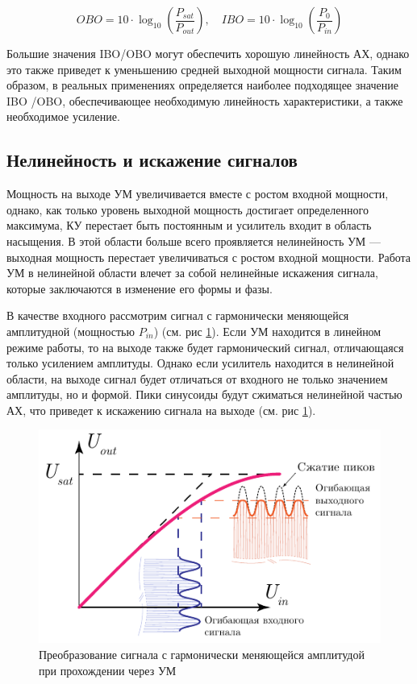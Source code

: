 \begin{equation}
    OBO = 10 \cdot \log_{10}\left(\frac{P_{sat}}{P_{out}}\right), \quad
    IBO = 10 \cdot \log_{10}\left(\frac{P_{0}}{P_{in}}\right)
\end{equation}

Большие значения IBO\slash OBO могут обеспечить хорошую линейность АХ,
однако это также приведет к уменьшению средней выходной мощности сигнала.
Таким образом, в реальных применениях определяется наиболее подходящее
значение IBO \slash OBO, обеспечивающее необходимую линейность
характеристики, а также необходимое усиление.


\subsection{Нелинейность и искажение сигналов}
Мощность на выходе УМ увеличивается вместе с ростом входной мощности,
однако, как только уровень выходной мощность достигает определенного
максимума, КУ перестает быть постоянным и усилитель входит в область
насыщения. В этой области больше всего проявляется нелинейность УМ —
выходная мощность перестает увеличиваться с ростом входной мощности. Работа
УМ в нелинейной области влечет за собой нелинейные искажения сигнала,
которые заключаются в изменение его формы и фазы.

В качестве входного рассмотрим сигнал с гармонически меняющейся амплитудной
(мощностью $P_{in}$) (см. рис \ref{fig:pa_distortion_sin}). Если УМ
находится в линейном режиме работы, то на выходе также будет гармонический
сигнал, отличающаяся только усилением амплитуды. Однако если усилитель
находится в нелинейной области, на выходе сигнал будет отличаться от
входного не только значением амплитуды, но и формой. Пики синусоиды будут
сжиматься нелинейной частью АХ, что приведет к искажению сигнала на выходе
(см. рис \ref{fig:pa_distortion_sin}).

\begin{figure}[h!]
    \centering
    \includegraphics[width=0.6\linewidth]{figs/amp_dist_obo.pdf}
    \caption{Преобразование сигнала с гармонически меняющейся амплитудой при прохождении через УМ}
    \label{fig:pa_distortion_sin}
\end{figure}

